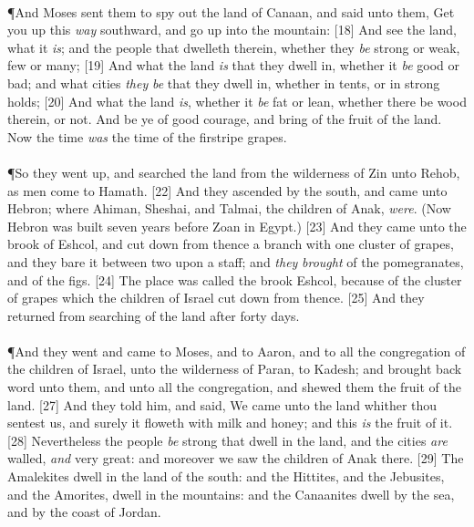 \\
\P \textcolor[cmyk]{0.99998,1,0,0}{And Moses sent them to spy out the land of Canaan, and said unto them, Get you up this \emph{way} southward, and go up into the mountain:}
[18] \textcolor[cmyk]{0.99998,1,0,0}{And see the land, what it \emph{is}; and the people that dwelleth therein, whether they \emph{be} strong or weak, few or many;}
[19] \textcolor[cmyk]{0.99998,1,0,0}{And what the land \emph{is} that they dwell in, whether it \emph{be} good or bad; and what cities \emph{they} \emph{be} that they dwell in, whether in tents, or in strong holds;}
[20] \textcolor[cmyk]{0.99998,1,0,0}{And what the land \emph{is}, whether it \emph{be} fat or lean, whether there be wood therein, or not. And be ye of good courage, and bring of the fruit of the land. Now the time \emph{was} the time of the firstripe grapes.}\\
\\
\P \textcolor[cmyk]{0.99998,1,0,0}{So they went up, and searched the land from the wilderness of Zin unto Rehob, as men come to Hamath.}
[22] \textcolor[cmyk]{0.99998,1,0,0}{And they ascended by the south, and came unto Hebron; where Ahiman, Sheshai, and Talmai, the children of Anak, \emph{were}. (Now Hebron was built seven years before Zoan in Egypt.)}
[23] \textcolor[cmyk]{0.99998,1,0,0}{And they came unto the brook of Eshcol, and cut down from thence a branch with one cluster of grapes, and they bare it between two upon a staff; and \emph{they} \emph{brought} of the pomegranates, and of the figs.}
[24] \textcolor[cmyk]{0.99998,1,0,0}{The place was called the brook Eshcol, because of the cluster of grapes which the children of Israel cut down from thence.}
[25] \textcolor[cmyk]{0.99998,1,0,0}{And they returned from searching of the land after forty days.}\\
\\
\P \textcolor[cmyk]{0.99998,1,0,0}{And they went and came to Moses, and to Aaron, and to all the congregation of the children of Israel, unto the wilderness of Paran, to Kadesh; and brought back word unto them, and unto all the congregation, and shewed them the fruit of the land.}
[27] \textcolor[cmyk]{0.99998,1,0,0}{And they told him, and said, We came unto the land whither thou sentest us, and surely it floweth with milk and honey; and this \emph{is} the fruit of it.}
[28] \textcolor[cmyk]{0.99998,1,0,0}{Nevertheless the people \emph{be} strong that dwell in the land, and the cities \emph{are} walled, \emph{and} very great: and moreover we saw the children of Anak there.}
[29] \textcolor[cmyk]{0.99998,1,0,0}{The Amalekites dwell in the land of the south: and the Hittites, and the Jebusites, and the Amorites, dwell in the mountains: and the Canaanites dwell by the sea, and by the coast of Jordan.}
